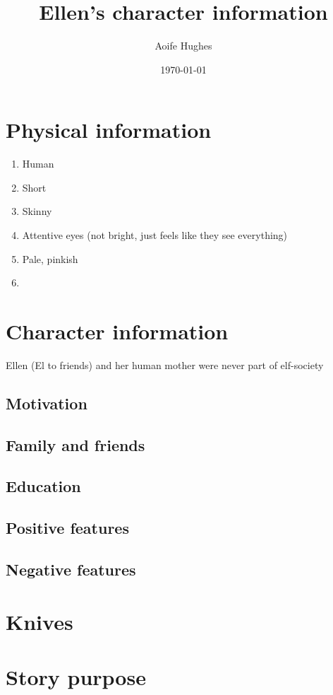 \documentclass[11pt]{article}
\title{Ellen's character information}
\author{Aoife Hughes}
\date{\today}
\begin{document}
\maketitle	
\pagebreak


\section{Physical information}

\begin{enumerate}
    \item Human
    \item Short
    \item Skinny
    \item Attentive eyes (not bright, just feels like they see everything)
    \item Pale, pinkish
    \item 
\end{enumerate}

\section{Character information}

Ellen (El to friends) and her human mother were never part of elf-society 

\subsection{Motivation}

\subsection{Family and friends}

\subsection{Education}

\subsection{Positive features}

\subsection{Negative features}

\section{Knives}



\section{Story purpose}
\end{document}
